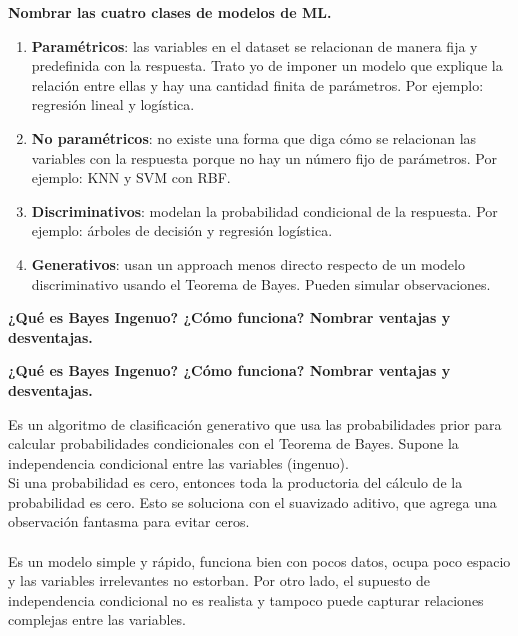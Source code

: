 \documentclass[10pt]{memoir}
\begin{document}
\clearpage
\begin{center}
	\textbf{\Large Nombrar las cuatro clases de modelos de ML.} \\
\end{center}
\begin{enumerate}
	\item \textbf{Paramétricos}: las variables en el dataset se relacionan de manera fija y predefinida con la respuesta. Trato yo de imponer un modelo que explique la relación entre ellas y hay una cantidad finita de parámetros. Por ejemplo: regresión lineal y logística.
	\item \textbf{No paramétricos}: no existe una forma que diga cómo se relacionan las variables con la respuesta porque no hay un número fijo de parámetros. Por ejemplo: KNN y SVM con RBF.
	\item \textbf{Discriminativos}: modelan la probabilidad condicional de la respuesta. Por ejemplo: árboles de decisión y regresión logística.
	\item \textbf{Generativos}: usan un approach menos directo respecto de un modelo discriminativo usando el Teorema de Bayes. Pueden simular observaciones.
\end{enumerate}

\clearpage
\begin{center}
	\textbf{\Large ¿Qué es Bayes Ingenuo? ¿Cómo funciona? Nombrar ventajas y desventajas.} \\
\end{center}

\clearpage
\begin{center}
	\textbf{\Large ¿Qué es Bayes Ingenuo? ¿Cómo funciona? Nombrar ventajas y desventajas.} \\
\end{center}
\noindent Es un algoritmo de clasificación generativo que usa las probabilidades prior para calcular probabilidades condicionales con el Teorema de Bayes. Supone la independencia condicional entre las variables (ingenuo). \\
Si una probabilidad es cero, entonces toda la productoria del cálculo de la probabilidad es cero. Esto se soluciona con el suavizado aditivo, que agrega una observación fantasma para evitar ceros. \\
\\
Es un modelo simple y rápido, funciona bien con pocos datos, ocupa poco espacio y las variables irrelevantes no estorban. Por otro lado, el supuesto de independencia condicional no es realista y tampoco puede capturar relaciones complejas entre las variables.
\end{document}
